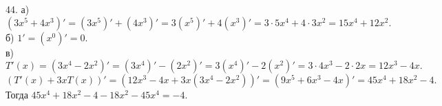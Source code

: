 44. а) $(3x^5+4x^3)'=(3x^5)'+(4x^3)'=3(x^5)'+4(x^3)'=3\cdot5x^4+4\cdot3x^2=15x^4+12x^2.$\\
б) $1'=(x^0)'=0.$\\
в) $T'(x)=(3x^4-2x^2)'=(3x^4)'-(2x^2)'=3(x^4)'-2(x^2)'=3\cdot4x^3-2\cdot2x=12x^3-4x.$\\
$(T'(x)+3xT(x))'=(12x^3-4x+3x(3x^4-2x^2))'=(9x^5+6x^3-4x)'=45x^4+18x^2-4.$ Тогда $45x^4+18x^2-4-18x^2-45x^4=-4.$\\
